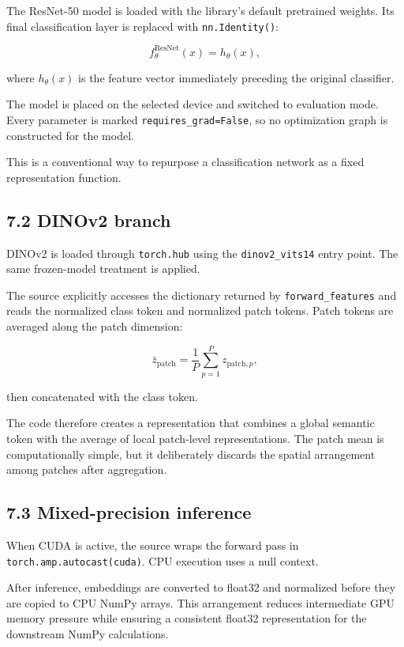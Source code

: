 \documentclass[
  11pt,
]{article}
\begin{document}
The ResNet-50 model is loaded with the library's default pretrained
weights. Its final classification layer is replaced with
\texttt{nn.Identity()}:

\[
f_{\theta}^{\mathrm{ResNet}}(x)
=
h_{\theta}(x),
\]

where \(h_\theta(x)\) is the feature vector immediately preceding the
original classifier.

The model is placed on the selected device and switched to evaluation
mode. Every parameter is marked \texttt{requires\_grad=False}, so no
optimization graph is constructed for the model.

This is a conventional way to repurpose a classification network as a
fixed representation function.

\subsection{7.2 DINOv2 branch}\label{dinov2-branch}

DINOv2 is loaded through \texttt{torch.hub} using the
\texttt{dinov2\_vits14} entry point. The same frozen-model treatment is
applied.

The source explicitly accesses the dictionary returned by
\texttt{forward\_features} and reads the normalized class token and
normalized patch tokens. Patch tokens are averaged along the patch
dimension:

\[
\bar z_{\mathrm{patch}}
=
\frac{1}{P}\sum_{p=1}^{P}z_{\mathrm{patch},p},
\]

then concatenated with the class token.

The code therefore creates a representation that combines a global
semantic token with the average of local patch-level representations. The patch mean is computationally simple, but it
deliberately discards the spatial arrangement among patches after
aggregation.

\subsection{7.3 Mixed-precision
inference}\label{mixed-precision-inference}

When CUDA is active, the source wraps the forward pass in
\texttt{torch.amp.autocast(\textquotesingle{}cuda\textquotesingle{})}.
CPU execution uses a null context.

After inference, embeddings are converted to float32 and normalized
before they are copied to CPU NumPy arrays. This arrangement reduces
intermediate GPU memory pressure while ensuring a consistent float32
representation for the downstream NumPy calculations.
\end{document}
